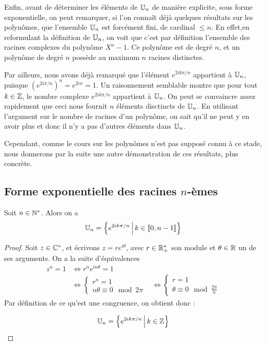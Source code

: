 Enfin, avant de déterminer les éléments de $\mathbb{U}_n$ de manière explicite, sous forme exponentielle, on peut remarquer, si l'on connaît déjà quelques résultats sur les polynômes, que l'ensemble $\mathbb{U}_n$ est forcément fini, de cardinal $\leq n$. En effet,en reformulant la définition de $\mathbb{U}_n$, on voit que c'est par définition l'ensemble des racines complexes du polynôme $X^n-1$. Ce polynôme est de degré $n$, et un polynôme de degré $n$ possède au maximum $n$ racines distinctes.

Par ailleurs, nous avons déjà remarqué que l'élément $e^{2ik\pi/n}$ appartient à $\mathbb{U}_n$, puisque $\left(e^{2i\pi/n}\right)^n=e^{2i\pi}=1$. Un raisonnement semblable montre que pour tout $k\in\mathbb{Z}$, le nombre complexe $e^{2ik\pi/n}$ appartient à $\mathbb{U}_n$. On peut se convaincre assez rapidement que ceci nous fournit $n$ éléments disctincts de $\mathbb{U}_n$. En utilisant l'argument sur le nombre de racines d'un polynôme, on sait qu'il ne peut y en avoir plus et donc il n'y a pas d'autres éléments dans $\mathbb{U}_n$.

Cependant, comme le cours sur les polynômes n'est pas supposé connu à ce stade, nous donnerons par la suite une autre démonstration de ces résultats, plus concrète.

\subsection{Forme exponentielle des racines $n$-èmes}


\begin{proposition}
Soit $n\in\mathbb{N}^*$. Alors on a
\[ \U_n = \ensemble{e^{2ik\pi/n}}{k\in \llbracket 0,n-1\rrbracket}\]
\end{proposition}
\begin{proof}
Soit $z\in\mathbb{C}^*$, et écrivons $z=re^{i\theta}$, avec $r\in\mathbb{R}_+^*$ son module et $\theta\in\mathbb{R}$ un de ses arguments. On a la suite d'équivalences
\begin{align*}
z^n=1 &\iff r^ne^{in\theta}=1\\
&\iff \begin{cases}r^n=1\\n\theta \equiv 0\mod 2\pi\end{cases}
&\iff \begin{cases}r=1\\\theta \equiv 0\mod \frac{2\pi}{n}\end{cases}
\end{align*}
Par définition de ce qu'est une congruence, on obtient donc :

\[ \U_n = \ensemble{e^{2ik\pi/n}}{k\in \Z}\]
\end{proof}

